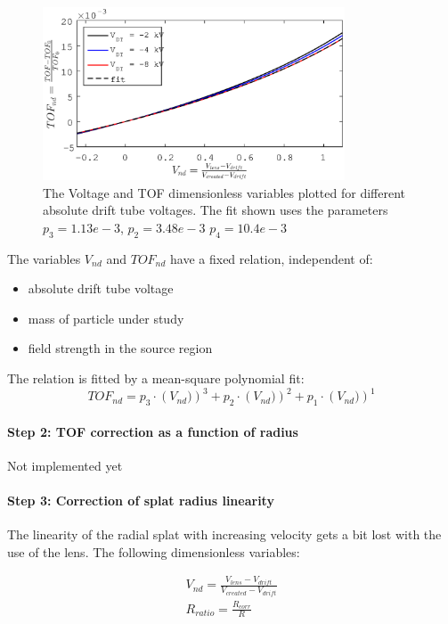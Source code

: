 \begin{figure}[h]
   \centering
    \centerline{\includegraphics[width=0.8\textwidth]{Graphics/lens_dTOF_vs_dV_dT_-8_-4_-2kV.eps}}
\caption{The Voltage and TOF dimensionless variables plotted for different absolute drift tube voltages. The fit shown uses the parameters $p_3 = 1.13e-3$, $p_2 = 3.48e-3$ $p_4 = 10.4 e-3$}
\label{Radius_correction_det_abb}
\end{figure}

The variables $V_{nd}$ and $TOF_{nd}$ have a fixed relation, independent of:
\begin{itemize}
\item absolute drift tube voltage
\item mass of particle under study
\item field strength in the source region
\end{itemize}

The relation is fitted by a mean-square polynomial fit:
\begin{equation}
TOF_{nd}	= p_3 \cdot \left(V_{nd}) \right)^3 + p_2 \cdot \left(V_{nd}) \right)^2 + p_1 \cdot \left(V_{nd}) \right)^1
\end{equation}

\paragraph{Step 2: TOF correction as a function of radius}
Not implemented yet

\paragraph{Step 3: Correction of splat radius linearity}
The linearity of the radial splat with increasing velocity gets a bit lost with the use of the lens. The following dimensionless variables:

\begin{align}
V_{nd} 		= \frac{V_{lens} - V_{drift}}{V_{created} - V_{drift}} \\
R_{ratio}	= \frac{R_{corr}}{R}
\end{align}

